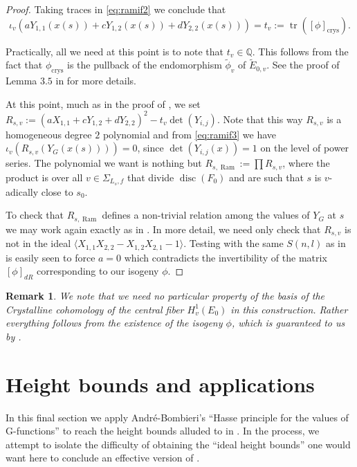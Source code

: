 \documentclass[12pt,twoside,a4paper]{article}
\theoremstyle{plain}%
\newtheorem{remark}[theorem]{Remark}
\DeclareMathOperator{\tr}{tr}
\DeclareMathOperator{\ram}{Ram}
\DeclareMathOperator{\disc}{disc}
\DeclareMathOperator{\crys}{crys}
\newcommand{\Q}{\mathbb{Q}}
\begin{document}
\begin{proof}
Taking traces in \eqref{eq:ramif2} we conclude that 
	\begin{equation}\label{eq:ramif3}
		\iota_v(a Y_{1,1}(x(s))+c Y_{1,2}(x(s))+dY_{2,2}(x(s)))=t_v:=\tr([\phi]_{\crys}).
	\end{equation}
	
Practically, all we need at this point is to note that $t_v\in \Q$. This follows from the fact that $\phi_{\crys}$ is the pullback of the endomorphism $\tilde{\phi}_v$ of $\tilde{E}_{0,v}$. See the proof of Lemma $3.5$ in \cite{daworrpap} for more details.

At this point, much as in the proof of , we set $R_{s,v}:=(aX_{1,1}+c Y_{1,2}+dY_{2,2})^2-t_v\det(Y_{i,j})$. Note that this way $R_{s,v}$ is a homogeneous degree $2$ polynomial and from \eqref{eq:ramif3} we have $\iota_v(R_{s,v}(Y_G(x(s))))=0$, since $\det(Y_{i,j}(x))=1$ on the level of power series. The polynomial we want is nothing but $R_{s,\ram}:=\prod R_{s,v}$, where the product is over all $v\in\Sigma_{L_s,f}$ that divide $\disc(F_0)$ and are such that $s$ is $v$-adically close to $s_0$.

To check that $R_{s,\ram}$ defines a non-trivial relation among the values of $Y_G$ at $s$ we may work again exactly as in . In more detail, we need only check that $R_{s,v}$ is not in the ideal $\langle X_{1,1}X_{2,2}-X_{1,2}X_{2,1}-1\rangle$. Testing with the same $S(n,l)$ as in  is easily seen to force $a=0$ which contradicts the invertibility of the matrix $[\phi]_{dR}$ corresponding to our isogeny $\phi$.\end{proof}

\begin{remark}
	We note that we need no particular property of the basis of the Crystalline cohomology of the central fiber $H^1_v(E_0)$ in this construction. Rather everything follows from the existence of the isogeny $\phi$, which is guaranteed to us by .
\end{remark}
\section{Height bounds and applications}\label{section:applications}

In this final section we apply Andr\'e-Bombieri's ``Hasse principle for the values of G-functions'' to reach the height bounds alluded to in . In the process, we attempt to isolate the difficulty of obtaining the ``ideal height bounds'' one would want here to conclude an effective version of \cite{siegel}.
\end{document}
